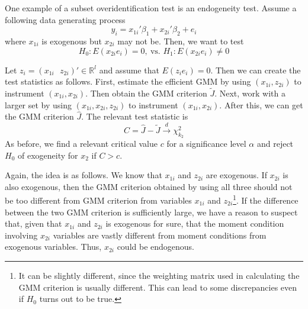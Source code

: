 \par
One example of a subset overidentification test is an endogeneity test. Assume a following data generating process
\[
y_i=x_{1i}'\beta_1+x_{2i}'\beta_2+e_i
\]
where $x_{1i}$ is exogenous but $x_{2i}$ may not be. Then, we want to test
\[
H_0: E(x_{2i}e_i)=0, \ \text{vs. }H_1:E(x_{2i}e_i)\neq0
\]\par
Let $z_i = (x_{1i} \ \ \ z_{2i})'\in\mathbb{R}^{l}$ and assume that $E(z_ie_i)=0$. Then we can create the test statistics as follows. First, estimate the efficient GMM by using $(x_{1i}, z_{2i})$ to instrument $(x_{1i}, x_{2i})$. Then obtain the GMM criterion $\tilde{J}$. Next, work with a larger set by using $(x_{1i}, x_{2i}, z_{2i})$ to instrument $(x_{1i}, x_{2i})$. After this, we can get the GMM criterion $\widehat{J}$. The relevant test statistic is
\[
C = \widehat{J}-\tilde{J} \xrightarrow{d} \chi^2_{k_2}
\]
As before, we find a relevant critical value $c$ for a significance level $\alpha$ and reject $H_0$ of exogeneity for $x_2$ if $C>c$. \par

Again, the idea is as follows. We know that $x_{1i}$ and $z_{2i}$ are exogenous. If $x_{2i}$ is also exogenous, then the GMM criterion obtained by using all three should not be too different from GMM criterion from variables $x_{1i}$ and $z_{2i}$\footnote{It can be slightly different, since the weighting matrix used in calculating the GMM criterion is usually different. This can lead to some discrepancies even if $H_0$ turns out to be true. }. If the difference between the two GMM criterion is sufficiently large, we have a reason to suspect that, given that $x_{1i}$ and $z_{2i}$ is exogenous for sure, that the moment condition involving $x_{2i}$ variables are vastly different from moment conditions from exogenous variables. Thus, $x_{2i}$ could be endogenous.  \par


